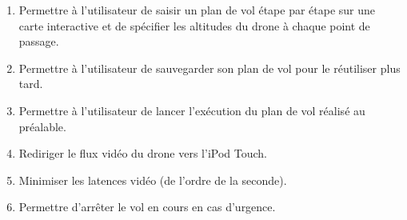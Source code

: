 \documentclass{article}
\begin{document}
        \vspace*{1cm}
		\begin{enumerate}
        	\item Permettre à l'utilisateur de saisir un plan de vol étape par étape sur une carte interactive et de spécifier les altitudes du drone à chaque point de passage.
        	\item Permettre à l'utilisateur de sauvegarder son plan de vol pour le réutiliser plus tard.
			\item Permettre à l'utilisateur de lancer l'exécution du plan de vol réalisé au préalable.
		 	\item Rediriger le flux vidéo du drone vers l'iPod Touch. 
		 	\item Minimiser les latences vidéo (de l'ordre de la seconde).
		 	\item Permettre d'arrêter le vol en cours en cas d'urgence.
		\end{enumerate}
		
\end{document}
